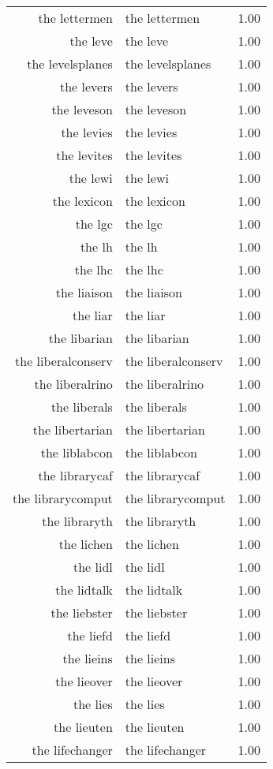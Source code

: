 \begin{table}[ht]
\begin{tabular}{rlr}
  the lettermen & the lettermen & 1.00 \\ 
  the leve & the leve & 1.00 \\ 
  the levelsplanes & the levelsplanes & 1.00 \\ 
  the levers & the levers & 1.00 \\ 
  the leveson & the leveson & 1.00 \\ 
  the levies & the levies & 1.00 \\ 
  the levites & the levites & 1.00 \\ 
  the lewi & the lewi & 1.00 \\ 
  the lexicon & the lexicon & 1.00 \\ 
  the lgc & the lgc & 1.00 \\ 
  the lh & the lh & 1.00 \\ 
  the lhc & the lhc & 1.00 \\ 
  the liaison & the liaison & 1.00 \\ 
  the liar & the liar & 1.00 \\ 
  the libarian & the libarian & 1.00 \\ 
  the liberalconserv & the liberalconserv & 1.00 \\ 
  the liberalrino & the liberalrino & 1.00 \\ 
  the liberals & the liberals & 1.00 \\ 
  the libertarian & the libertarian & 1.00 \\ 
  the liblabcon & the liblabcon & 1.00 \\ 
  the librarycaf & the librarycaf & 1.00 \\ 
  the librarycomput & the librarycomput & 1.00 \\ 
  the libraryth & the libraryth & 1.00 \\ 
  the lichen & the lichen & 1.00 \\ 
  the lidl & the lidl & 1.00 \\ 
  the lidtalk & the lidtalk & 1.00 \\ 
  the liebster & the liebster & 1.00 \\ 
  the liefd & the liefd & 1.00 \\ 
  the lieins & the lieins & 1.00 \\ 
  the lieover & the lieover & 1.00 \\ 
  the lies & the lies & 1.00 \\ 
  the lieuten & the lieuten & 1.00 \\ 
  the lifechanger & the lifechanger & 1.00 \\ 

\end{tabular}
\end{table}
